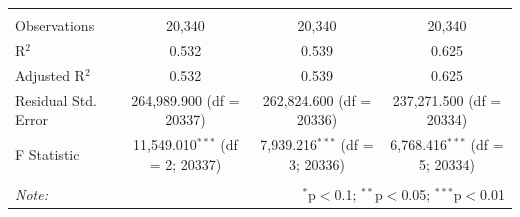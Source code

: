 \documentclass[12pt,letterpaper]{article}
\begin{document}
\begin{table}[!htbp]
\begin{tabular}{@{\extracolsep{5pt}}lccc}
		& & & \\ 
		\hline \\[-1.8ex] 
		Observations & 20,340 & 20,340 & 20,340 \\ 
		R$^{2}$ & 0.532 & 0.539 & 0.625 \\ 
		Adjusted R$^{2}$ & 0.532 & 0.539 & 0.625 \\ 
		Residual Std. Error & 264,989.900 (df = 20337) & 262,824.600 (df = 20336) & 237,271.500 (df = 20334) \\ 
		F Statistic & 11,549.010$^{***}$ (df = 2; 20337) & 7,939.216$^{***}$ (df = 3; 20336) & 6,768.416$^{***}$ (df = 5; 20334) \\ 
		\hline 
		\hline \\[-1.8ex] 
		\textit{Note:}  & \multicolumn{3}{r}{$^{*}$p$<$0.1; $^{**}$p$<$0.05; $^{***}$p$<$0.01} \\ 
	\end{tabular} 
\end{table}
\end{document}
